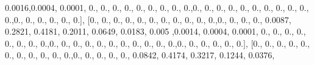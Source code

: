 \documentclass[
]{book}
\newenvironment{Shaded}{\begin{snugshade}}{\end{snugshade}}
\newcommand{\FloatTok}[1]{\textcolor[rgb]{0.00,0.00,0.81}{#1}}
\newcommand{\NormalTok}[1]{#1}
\begin{document}
\begin{Shaded}
\begin{Highlighting}[]
\FloatTok{0.0016}\NormalTok{,}\FloatTok{0.0004}\NormalTok{, }\FloatTok{0.0001}\NormalTok{, }\FloatTok{0.}\NormalTok{, }\FloatTok{0.}\NormalTok{, }\FloatTok{0.}\NormalTok{, }\FloatTok{0.}\NormalTok{, }\FloatTok{0.}\NormalTok{, }\FloatTok{0.}\NormalTok{, }\FloatTok{0.}\NormalTok{, }\FloatTok{0.}\NormalTok{, }\FloatTok{0.}\NormalTok{,}\FloatTok{0.}\NormalTok{, }\FloatTok{0.}\NormalTok{, }\FloatTok{0.}\NormalTok{, }\FloatTok{0.}\NormalTok{, }\FloatTok{0.}\NormalTok{,}
\FloatTok{0.}\NormalTok{, }\FloatTok{0.}\NormalTok{, }\FloatTok{0.}\NormalTok{, }\FloatTok{0.}\NormalTok{, }\FloatTok{0.}\NormalTok{, }\FloatTok{0.}\NormalTok{,}\FloatTok{0.}\NormalTok{, }\FloatTok{0.}\NormalTok{, }\FloatTok{0.}\NormalTok{, }\FloatTok{0.}\NormalTok{, }\FloatTok{0.}\NormalTok{, }\FloatTok{0.}\NormalTok{], [}\FloatTok{0.}\NormalTok{, }\FloatTok{0.}\NormalTok{, }\FloatTok{0.}\NormalTok{, }\FloatTok{0.}\NormalTok{, }\FloatTok{0.}\NormalTok{, }\FloatTok{0.}\NormalTok{, }\FloatTok{0.}\NormalTok{, }\FloatTok{0.}\NormalTok{,}
\FloatTok{0.}\NormalTok{, }\FloatTok{0.}\NormalTok{, }\FloatTok{0.}\NormalTok{,}\FloatTok{0.}\NormalTok{, }\FloatTok{0.}\NormalTok{, }\FloatTok{0.}\NormalTok{, }\FloatTok{0.}\NormalTok{, }\FloatTok{0.0087}\NormalTok{, }\FloatTok{0.2821}\NormalTok{, }\FloatTok{0.4181}\NormalTok{, }\FloatTok{0.2011}\NormalTok{, }\FloatTok{0.0649}\NormalTok{, }\FloatTok{0.0183}\NormalTok{, }\FloatTok{0.005}
\NormalTok{,}\FloatTok{0.0014}\NormalTok{, }\FloatTok{0.0004}\NormalTok{, }\FloatTok{0.0001}\NormalTok{, }\FloatTok{0.}\NormalTok{, }\FloatTok{0.}\NormalTok{, }\FloatTok{0.}\NormalTok{, }\FloatTok{0.}\NormalTok{, }\FloatTok{0.}\NormalTok{, }\FloatTok{0.}\NormalTok{, }\FloatTok{0.}\NormalTok{, }\FloatTok{0.}\NormalTok{,}\FloatTok{0.}\NormalTok{, }\FloatTok{0.}\NormalTok{, }\FloatTok{0.}\NormalTok{, }\FloatTok{0.}\NormalTok{, }\FloatTok{0.}\NormalTok{, }\FloatTok{0.}\NormalTok{,}
\FloatTok{0.}\NormalTok{, }\FloatTok{0.}\NormalTok{, }\FloatTok{0.}\NormalTok{, }\FloatTok{0.}\NormalTok{, }\FloatTok{0.}\NormalTok{,}\FloatTok{0.}\NormalTok{, }\FloatTok{0.}\NormalTok{, }\FloatTok{0.}\NormalTok{, }\FloatTok{0.}\NormalTok{, }\FloatTok{0.}\NormalTok{, }\FloatTok{0.}\NormalTok{], [}\FloatTok{0.}\NormalTok{, }\FloatTok{0.}\NormalTok{, }\FloatTok{0.}\NormalTok{, }\FloatTok{0.}\NormalTok{, }\FloatTok{0.}\NormalTok{, }\FloatTok{0.}\NormalTok{, }\FloatTok{0.}\NormalTok{, }\FloatTok{0.}\NormalTok{, }\FloatTok{0.}\NormalTok{,}
\FloatTok{0.}\NormalTok{, }\FloatTok{0.}\NormalTok{,}\FloatTok{0.}\NormalTok{, }\FloatTok{0.}\NormalTok{, }\FloatTok{0.}\NormalTok{, }\FloatTok{0.}\NormalTok{, }\FloatTok{0.}\NormalTok{, }\FloatTok{0.0842}\NormalTok{, }\FloatTok{0.4174}\NormalTok{, }\FloatTok{0.3217}\NormalTok{, }\FloatTok{0.1244}\NormalTok{, }\FloatTok{0.0376}\NormalTok{,}

\end{Highlighting}
\end{Shaded}
\end{document}
